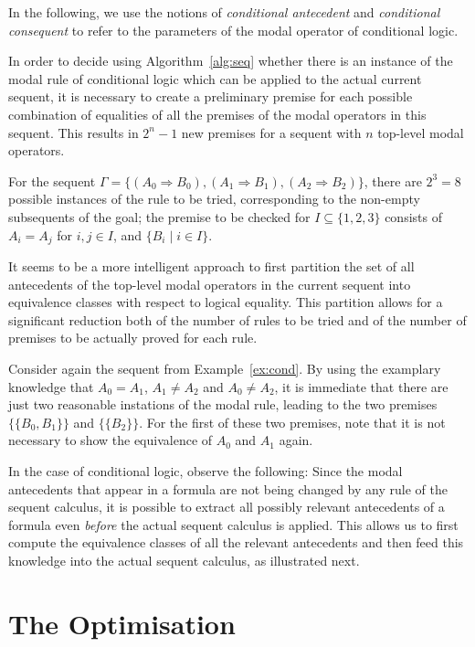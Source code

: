 \documentclass{entcs} \usepackage{entcsmacro}
\begin{document}
In the following, we use the notions of \emph{conditional antecedent} and
\emph{conditional consequent} to refer to the parameters of the modal operator of
conditional logic. 

In order to decide using Algorithm~\ref{alg:seq} whether there is an
instance of the modal rule of conditional logic which can be applied
to the actual current sequent, it is necessary to create a preliminary
premise for each possible combination of equalities of all the
premises of the modal operators in this sequent. This results in
$2^n-1$ new premises for a sequent with $n$ top-level modal
operators. 
\begin{example}\label{ex:cond}
For the sequent $\Gamma=\{(A_0\Rightarrow B_0),
(A_1\Rightarrow B_1), (A_2\Rightarrow B_2)\}$, there are $2^3=8$
possible instances of the rule to be tried, corresponding to the
non-empty subsequents of the goal; the premise to be checked for
$I\subseteq\{1,2,3\}$ consists of $A_i=A_j$ for $i,j\in I$, and
$\{B_i\mid i\in I\}$.
\end{example}
\noindent It seems to be a more intelligent approach to first
partition the set of all antecedents of the top-level modal operators
in the current sequent into equivalence classes with respect to
logical equality.  This partition allows for a significant reduction
both of the number of rules to be tried and of the number of premises
to be actually proved for each rule.

\begin{example}
Consider again the sequent from Example~\ref{ex:cond}. By using the examplary
knowledge that $A_0=A_1$, $A_1\neq A_2$ and $A_0\neq A_2$, it is immediate
that there are just two reasonable instations of the modal rule, leading
to the two premises $\{\{B_0,B_1\}\}$ and $\{\{B_2\}\}$. For the
first of these two premises, note that it is not necessary to show the
equivalence of $A_0$ and $A_1$ again.
\end{example}


\noindent In the case of conditional logic, observe the following:
Since the modal antecedents that appear in a formula are not being
changed by any rule of the sequent calculus, it is possible to extract
all possibly relevant antecedents of a formula even \emph{before} the
actual sequent calculus is applied. This allows us to first compute
the equivalence classes of all the relevant antecedents and then feed
this knowledge into the actual sequent calculus, as illustrated next.

\section{The Optimisation}
\end{document}
